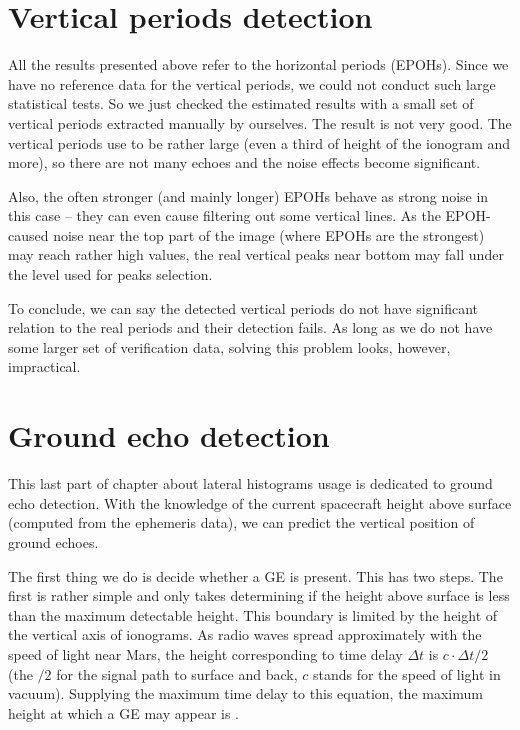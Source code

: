 \section{Vertical periods detection}
All the results presented above refer to the horizontal periods (EPOHs). Since we have no reference data for the vertical periods, we could not conduct such large statistical tests. So we just checked the estimated results with a small set of vertical periods extracted manually by ourselves. The result is not very good. The vertical periods use to be rather large (even a third of height of the ionogram and more), so there are not many echoes and the noise effects become significant. 

Also, the often stronger (and mainly longer) EPOHs behave as strong noise in this case -- they can even cause filtering out some vertical lines. As the EPOH-caused noise near the top part of the image (where EPOHs are the strongest) may reach rather high values, the real vertical peaks near bottom may fall under the  level used for peaks selection.

To conclude, we can say the detected vertical periods do not have significant relation to the real periods and their detection fails. As long as we do not have some larger set of verification data, solving this problem looks, however, impractical. 

\section{Ground echo detection}
\label{sec:ge_detection}
This last part of chapter about lateral histograms usage is dedicated to ground echo detection. With the knowledge of the current spacecraft height above surface (computed from the ephemeris data), we can predict the vertical position of ground echoes.

The first thing we do is decide whether a GE is present. This has two steps. The first is rather simple and only takes determining if the height above surface is less than the maximum detectable height. This boundary is limited by the  height of the vertical axis of ionograms. As radio waves spread approximately with the speed of light near Mars, the height corresponding to time delay $\Delta t$ is $c \cdot \Delta t / 2$ (the $/2$ for the signal path to surface and back, $c$ stands for the speed of light in vacuum). Supplying the maximum time delay to this equation, the maximum height at which a GE may appear is .

